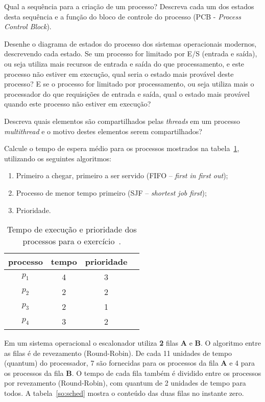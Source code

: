  Qual a sequência para a criação de um processo? Descreva
cada um dos estados desta sequência e a função do bloco de controle do
processo (PCB - \emph{Process Control Block}).

 Desenhe o diagrama de estados do processo dos sistemas
operacionais modernos, descrevendo cada estado. Se um processo for
limitado por E/S (entrada e saída), ou seja utiliza mais recursos de
entrada e saída do que processamento, e este processo não estiver em
execução, qual seria o estado mais provável deste processo? E se o
processo for limitado por processamento, ou seja utiliza mais o
processador do que requisições de entrada e saída, qual o estado mais
provável quando este processo não estiver em execução?

 Descreva quais elementos são compartilhados pelas {\em
  threads} em um processo {\em multithread} e o motivo destes
elementos serem compartilhados?

 Calcule o tempo de espera médio para os processos
mostrados na tabela~\ref{tab:simple}, utilizando os seguintes
algoritmos:

\begin{enumerate}
\item Primeiro a chegar, primeiro a ser servido (FIFO -- {\em first in
  first out});
\item Processo de menor tempo primeiro (SJF -- {\em shortest job first});
\item Prioridade.
\end{enumerate}

\begin{table}[h]
  \centering
  \begin{tabular}{cccc}\hline
    \bf processo & \bf tempo & \bf prioridade \\\hline
    $p_1$ & 4 & 3 \\
    $p_2$ & 2& 2\\
    $p_3$ & 2& 1\\
    $p_4$ & 3& 2\\\hline
  \end{tabular}
  \caption{Tempo de execução e prioridade dos processos para o exercício~.}
  \label{tab:simple}
\end{table}

 Em um sistema operacional o escalonador utiliza {\bf 2}
filas {\bf A} e {\bf B}. O algoritmo entre as filas é de revezamento
(Round-Robin). De cada 11 unidades de tempo (quantum) do processador,
7 são fornecidas para os processos da fila {\bf A} e 4 para os
processos da fila {\bf B}. O tempo de cada fila também é dividido
entre os processos por revezamento (Round-Robin), com quantum de 2
unidades de tempo para todos. A tabela~\ref{so:sched} mostra o
conteúdo das duas filas no instante zero.

